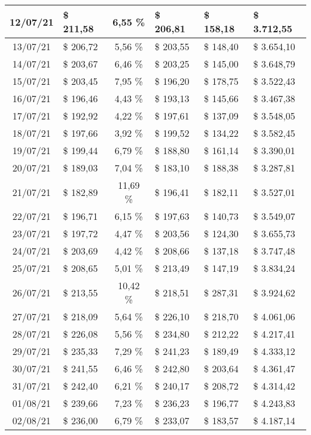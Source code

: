 \begin{center}
\begin{small}
\begin{longtable}{|c|l|c|l|l|l|}
12/07/21 & \$ 211,58 & 6,55 \% & \$ 206,81 & \$ 158,18 & \$ 3.712,55 \\ \hline
13/07/21 & \$ 206,72 & 5,56 \% & \$ 203,55 & \$ 148,40 & \$ 3.654,10 \\ \hline
14/07/21 & \$ 203,67 & 6,46 \% & \$ 203,25 & \$ 145,00 & \$ 3.648,79 \\ \hline
15/07/21 & \$ 203,45 & 7,95 \% & \$ 196,20 & \$ 178,75 & \$ 3.522,43 \\ \hline
16/07/21 & \$ 196,46 & 4,43 \% & \$ 193,13 & \$ 145,66 & \$ 3.467,38 \\ \hline
17/07/21 & \$ 192,92 & 4,22 \% & \$ 197,61 & \$ 137,09 & \$ 3.548,05 \\ \hline
18/07/21 & \$ 197,66 & 3,92 \% & \$ 199,52 & \$ 134,22 & \$ 3.582,45 \\ \hline
19/07/21 & \$ 199,44 & 6,79 \% & \$ 188,80 & \$ 161,14 & \$ 3.390,01 \\ \hline
20/07/21 & \$ 189,03 & 7,04 \% & \$ 183,10 & \$ 188,38 & \$ 3.287,81 \\ \hline
21/07/21 & \$ 182,89 & 11,69 \% & \$ 196,41 & \$ 182,11 & \$ 3.527,01 \\ \hline
22/07/21 & \$ 196,71 & 6,15 \% & \$ 197,63 & \$ 140,73 & \$ 3.549,07 \\ \hline
23/07/21 & \$ 197,72 & 4,47 \% & \$ 203,56 & \$ 124,30 & \$ 3.655,73 \\ \hline
24/07/21 & \$ 203,69 & 4,42 \% & \$ 208,66 & \$ 137,18 & \$ 3.747,48 \\ \hline
25/07/21 & \$ 208,65 & 5,01 \% & \$ 213,49 & \$ 147,19 & \$ 3.834,24 \\ \hline
26/07/21 & \$ 213,55 & 10,42 \% & \$ 218,51 & \$ 287,31 & \$ 3.924,62 \\ \hline
27/07/21 & \$ 218,09 & 5,64 \% & \$ 226,10 & \$ 218,70 & \$ 4.061,06 \\ \hline
28/07/21 & \$ 226,08 & 5,56 \% & \$ 234,80 & \$ 212,22 & \$ 4.217,41 \\ \hline
29/07/21 & \$ 235,33 & 7,29 \% & \$ 241,23 & \$ 189,49 & \$ 4.333,12 \\ \hline
30/07/21 & \$ 241,55 & 6,46 \% & \$ 242,80 & \$ 203,64 & \$ 4.361,47 \\ \hline
31/07/21 & \$ 242,40 & 6,21 \% & \$ 240,17 & \$ 208,72 & \$ 4.314,42 \\ \hline
01/08/21 & \$ 239,66 & 7,23 \% & \$ 236,23 & \$ 196,77 & \$ 4.243,83 \\ \hline
02/08/21 & \$ 236,00 & 6,79 \% & \$ 233,07 & \$ 183,57 & \$ 4.187,14 \\ \hline

\end{longtable}
\end{small}
\end{center}
